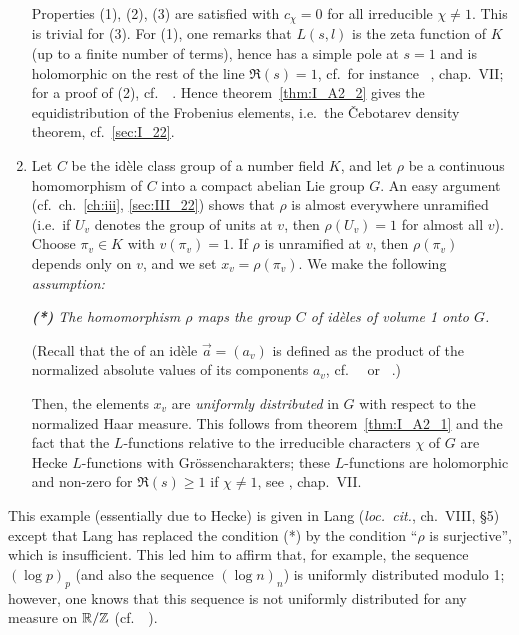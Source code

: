 \begin{subappendices}
\begin{ex}
\begin{enumerate}[series=ex_IA3]
	Properties (1), (2), (3) are satisfied with $c_\chi = 0$ for all
	irreducible $\chi \ne 1$. This is trivial for (3). For (1), one remarks
	that $L(s,l)$ is the zeta function of $K$ (up to a finite number of
	terms), hence has a simple pole at $s = 1$ and is holomorphic on the
	\dpage
	rest of the line $\Re(s) = 1$, cf.\ for instance
	\citeauthor{13}~\cite{13}, chap.\ VII; for a proof of (2), cf.\
	\citeauthor{1}~\cite[121]{1}.  Hence theorem~\ref{thm:I_A2_2} gives the
	equidistribution of the Frobenius elements, i.e.\ the \v Cebotarev
	density theorem, cf.\ \ref{sec:I_22}.

\item Let $C$ be the idèle class group of a number field $K$, and let $\rho$ be
	a continuous homomorphism of $C$ into a compact abelian Lie group $G$.
	An easy argument (cf.\ ch.~\ref{ch:iii}, \ref{sec:III_22}) shows that
	$\rho$ is almost everywhere unramified (i.e.\, if $U_v$ denotes the
	group of units at $v$, then $\rho(U_v) = 1$ for almost all $v$). Choose
	$\pi_v \in K$ with $v(\pi_v) = 1$. If $\rho$ is unramified at $v$, then
	$\rho(\pi_v)$ depends only on $v$, and we set $x_v = \rho(\pi_v)$. We
	make the following \emph{assumption:}
	\begin{displayquote}
		\slshape
		\textbf{(*)}
		The homomorphism $\rho$ maps the group $C$ of idèles of
		volume 1 onto $G$.
	\end{displayquote}
	(Recall that the  of an idèle $\vec a = (a_v)$ is
	defined as the product of the normalized absolute values of its
	components $a_v$, cf.\ \citeauthor{13}~\cite{13} or
	\citeauthor{44}~\cite{44}.)

	Then, the elements $x_v$ are \emph{uniformly distributed} in $G$ with
	respect to the normalized Haar measure. This follows from
	theorem~\ref{thm:I_A2_1} and the fact that the $L$-functions relative
	to the irreducible characters $\chi$ of $G$ are Hecke $L$-functions
	with Grössencharakters; these $L$-functions are holomorphic and
	non-zero for $\Re(s) \ge 1$ if $\chi \ne 1$, see \cite{13}, chap.\ VII.
\end{enumerate}
\end{ex}

\begin{obs}
This example (essentially due to Hecke) is given in Lang
(\emph{loc.\ cit.}, ch.~VIII, \S 5) except that Lang has replaced the condition
(*) by the condition ``$\rho$ is surjective'', which is insufficient. This
led him to affirm that, for example, the sequence $(\log p)_p$ (and also
the sequence $(\log n)_n$) is uniformly distributed modulo 1; however,
\dpage
one knows that this sequence is not uniformly distributed for any
measure on $\mathbb{R}/\mathbb{Z}$ (cf.\ \citeauthor{22}~\cite[179-180]{22}).
\end{obs}


\end{subappendices}
